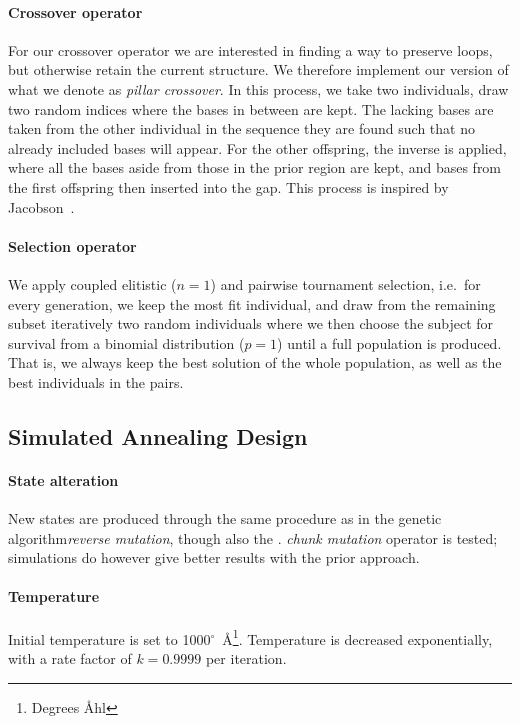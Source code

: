 \documentclass[10pt, twocolumn]{article}\usepackage[]{graphicx}\usepackage[]{color}
\theoremstyle{plain}
\newcommand{\ga}{genetic algorithm\xspace}
\begin{document}
    \paragraph{Crossover operator}
      For our crossover operator we are interested in finding a way to preserve loops, but otherwise retain the current structure. We therefore implement our version of what we denote as \textit{pillar crossover}. In this process, we take two individuals, draw two random indices where the bases in between are kept. The lacking bases are taken from the other individual in the sequence they are found such that no already included bases will appear. For the other offspring, the inverse is applied, where all the bases aside from those in the prior region are kept, and bases from the first offspring then inserted into the gap. This process is inspired by Jacobson~\cite{crossover}.
      
    \paragraph{Selection operator}
      We apply coupled elitistic ($n = 1$) and pairwise tournament selection, i.e.\ for every generation, we keep the most fit individual, and draw from the remaining subset iteratively two random individuals where we then choose the subject for survival from a binomial distribution ($p=1$) until a full population is produced. That is, we always keep the best solution of the whole population, as well as the best individuals in the pairs.
      
  \subsection{Simulated Annealing Design}
    \paragraph{State alteration}
      New states are produced through the same procedure as in the \ga \textit{reverse mutation}, though also the . 
      \textit{chunk mutation} operator is tested; simulations do however give better results with the prior approach. 
    \paragraph{Temperature}
      Initial temperature is set to 1000$^\circ$~Å\footnote{Degrees Åhl}. Temperature is decreased exponentially, with a rate factor of $k = 0.9999$ per iteration. 
\end{document}
